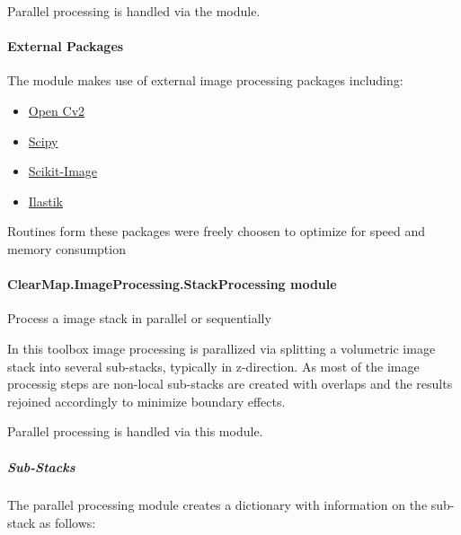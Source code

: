 \documentclass[letterpaper,10pt,english]{sphinxmanual}
\begin{document}
Parallel processing is handled via the
{\hyperref[api/ClearMap.ImageProcessing:module-ClearMap.ImageProcessing.StackProcessing]{\emph{}}} module.


\paragraph{External Packages}
\label{api/ClearMap.ImageProcessing:external-packages}
The {\hyperref[api/ClearMap.ImageProcessing:module-ClearMap.ImageProcessing]{\emph{}}} module makes use of external image
processing packages including:
\begin{itemize}
\item {} 
\href{http://opencv.org/}{Open Cv2}

\item {} 
\href{http://www.scipy.org/}{Scipy}

\item {} 
\href{http://scikit-image.org/docs/dev/api/skimage.html}{Scikit-Image}

\item {} 
\href{http://ilastik.org/}{Ilastik}

\end{itemize}

Routines form these packages were freely choosen to optimize for speed and
memory consumption


\paragraph{ClearMap.ImageProcessing.StackProcessing module}
\label{api/ClearMap.ImageProcessing:clearmap-imageprocessing-stackprocessing-module}\label{api/ClearMap.ImageProcessing:module-ClearMap.ImageProcessing.StackProcessing}
Process a image stack in parallel or sequentially

In this toolbox image processing is parallized via splitting a volumetric
image stack into several sub-stacks, typically in z-direction. As most of
the image processig steps are non-local sub-stacks are created with overlaps
and the results rejoined accordingly to minimize boundary effects.

Parallel processing is handled via this module.


\subparagraph{Sub-Stacks}
\label{api/ClearMap.ImageProcessing:sub-stacks}\label{api/ClearMap.ImageProcessing:substack}
The parallel processing module creates a dictionary with information on
the sub-stack as follows:
\end{document}
